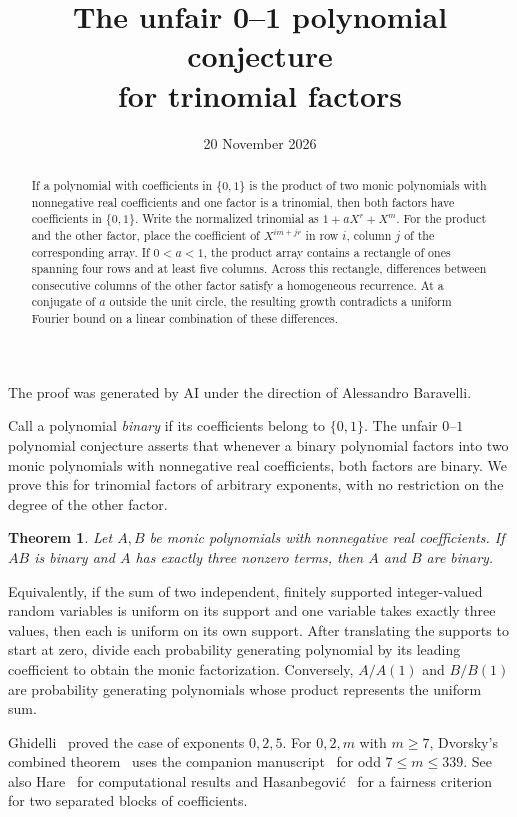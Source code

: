 \documentclass[11pt,reqno]{amsart}
\title[The unfair 0--1 conjecture for trinomial factors]{The unfair 0--1 polynomial conjecture\\ for trinomial factors}
\date{20 November 2026}
\newtheorem{theorem}{Theorem}
\begin{document}
\begin{abstract}
If a polynomial with coefficients in \(\{0,1\}\) is the product of two monic polynomials with nonnegative real coefficients and one factor is a trinomial, then both factors have coefficients in \(\{0,1\}\). Write the normalized trinomial as \(1+aX^r+X^m\). For the product and the other factor, place the coefficient of \(X^{im+jr}\) in row \(i\), column \(j\) of the corresponding array. If \(0<a<1\), the product array contains a rectangle of ones spanning four rows and at least five columns. Across this rectangle, differences between consecutive columns of the other factor satisfy a homogeneous recurrence. At a conjugate of \(a\) outside the unit circle, the resulting growth contradicts a uniform Fourier bound on a linear combination of these differences.
\end{abstract}
\maketitle
\enlargethispage{2pt}
\begin{center}
\small The proof was generated by AI under the direction of Alessandro Baravelli.
\end{center}

Call a polynomial \emph{binary} if its coefficients belong to \(\{0,1\}\). The unfair \(0\)--\(1\) polynomial conjecture asserts that whenever a binary polynomial factors into two monic polynomials with nonnegative real coefficients, both factors are binary. We prove this for trinomial factors of arbitrary exponents, with no restriction on the degree of the other factor.

\begin{theorem}\label{thm:main}
Let \(A,B\) be monic polynomials with nonnegative real coefficients. If \(AB\) is binary and \(A\) has exactly three nonzero terms, then \(A\) and \(B\) are binary.
\end{theorem}

Equivalently, if the sum of two independent, finitely supported integer-valued random variables is uniform on its support and one variable takes exactly three values, then each is uniform on its own support. After translating the supports to start at zero, divide each probability generating polynomial by its leading coefficient to obtain the monic factorization. Conversely, \(A/A(1)\) and \(B/B(1)\) are probability generating polynomials whose product represents the uniform sum.

Ghidelli~\cite[Theorem~1.2]{ghidelli} proved the case of exponents \(0,2,5\). For \(0,2,m\) with \(m\ge7\), Dvorsky's combined theorem~\cite[Theorem~1.1]{dvorsky} uses the companion manuscript~\cite{dvorsky-finite} for odd \(7\le m\le339\). See also Hare~\cite{hare} for computational results and Hasanbegovi\'c~\cite{hasanbegovic} for a fairness criterion for two separated blocks of coefficients.
\end{document}

